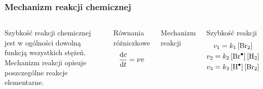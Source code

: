 \documentclass{beamer}
\begin{document}
\begin{frame}
\frametitle{Mechanizm reakcji chemicznej}
\begin{columns}
Szybkość reakcji chemicznej jest w ogólności dowolną funkcją wszystkich stężeń. Mechanizm reakcji opisuje poszczególne reakcje elementarne.
\begin{block}{Równania różniczkowe}
\begin{gather*}
\dv{c}{t} = \nu v
\end{gather*}
\end{block}
\begin{block}{Mechanizm reakcji}
\begin{center}
 \\
 \\
\end{center}
\end{block}
\begin{block}{Szybkość reakcji}
\begin{gather*}
v_{1} = k_{1}\left[\ce{Br2}\right] \\
v_{2} = k_{2}\left[\ce{Br^{.}}\right]\left[\ce{H2}\right] \\
v_{3} = k_{3}\left[\ce{H^{.}}\right]\left[\ce{Br2}\right]
\end{gather*}
\end{block}
\end{columns}
\end{frame}
\end{document}
